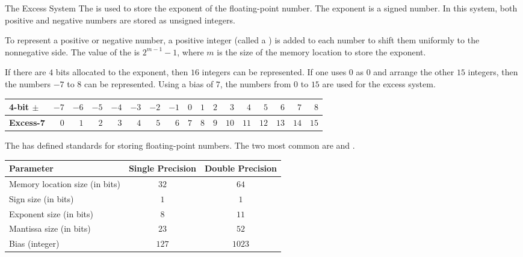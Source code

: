 \documentclass[../notes.tex]{subfiles}
\begin{document}
				\begin{definition}{The Excess System}
					The  is used to store the exponent of the floating-point number. The exponent is a signed number. In this system, both positive and negative numbers are stored as unsigned integers.
					\begin{indentparagraph}
						To represent a positive or negative number, a positive integer (called a ) is added to each number to shift them uniformly to the nonnegative side. The value of the  is $2^{m - 1} - 1$, where $m$ is the size of the memory location to store the exponent.
					\end{indentparagraph}
				\end{definition}
				\begin{example}
					If there are $4$ bits allocated to the exponent, then $16$ integers can be represented. If one uses $0$ as $0$ and arrange the other $15$ integers, then the numbers $-7$ to $8$ can be represented. Using a bias of $7$, the numbers from $0$ to $15$ are used for the excess system.
					\begin{center}
						\begin{tabular}{lrrrrrrrrrrrrrrrr}
							\textbf{4-bit $\pm$} & $-7$ & $-6$ & $-5$ & $-4$ & $-3$ & $-2$ & $-1$ & $0$ &
							$1$ & $2$ & $3$ & $4$ & $5$ & $6$ & $7$ & $8$\\
							\midrule
							\textbf{Excess-7} & $0$ & $1$ & $2$ & $3$ & $4$ & $5$ & $6$ & $7$ & 
							$8$ & $9$ & $10$ & $11$ & $12$ & $13$ & $14$ & $15$\\
						\end{tabular}
					\end{center}
				\end{example}
				The  has defined standards for storing floating-point numbers. The two most common are  and .
				\begin{center}
					\begin{tabular}{lcc}
						\toprule
						Parameter & Single Precision & Double Precision\\
						\midrule
						Memory location size (in bits) & $32$ & $64$\\
						Sign size (in bits) & $1$ & $1$\\
						Exponent size (in bits) & $8$ & $11$\\
						Mantissa size (in bits) & $23$ & $52$\\
						Bias (integer) & $127$ & $1023$\\
						\bottomrule
					\end{tabular}
				\end{center}
\end{document}
